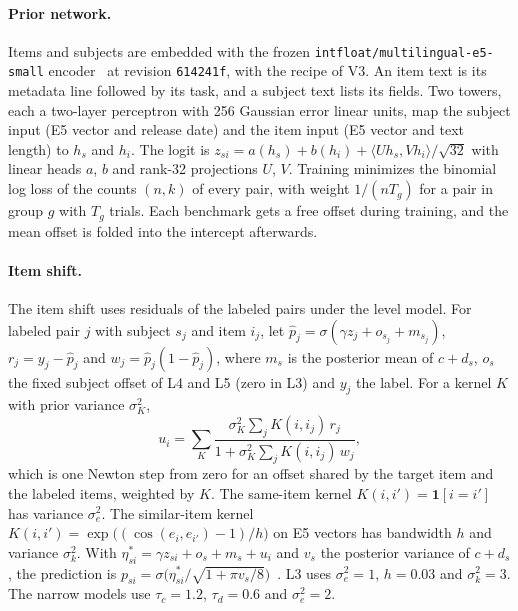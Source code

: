 \documentclass{article}
\begin{document}
\paragraph{Prior network.} Items and subjects are embedded with the frozen \texttt{intfloat/multilingual-e5-small} encoder~\citep{e5} at revision \texttt{614241f}, with the recipe of V3. An item text is its metadata line followed by its task, and a subject text lists its fields. Two towers, each a two-layer perceptron with 256 Gaussian error linear units, map the subject input (E5 vector and release date) and the item input (E5 vector and text length) to $h_s$ and $h_i$. The logit is $z_{si} = a(h_s) + b(h_i) + \langle U h_s, V h_i\rangle/\sqrt{32}$ with linear heads $a$, $b$ and rank-32 projections $U$, $V$. Training minimizes the binomial log loss of the counts $(n,k)$ of every pair, with weight $1/(nT_g)$ for a pair in group $g$ with $T_g$ trials. Each benchmark gets a free offset during training, and the mean offset is folded into the intercept afterwards.

\paragraph{Item shift.} The item shift uses residuals of the labeled pairs under the level model. For labeled pair $j$ with subject $s_j$ and item $i_j$, let $\hat p_j=\sigma(\gamma z_j + o_{s_j} + m_{s_j})$, $r_j = y_j-\hat p_j$ and $w_j=\hat p_j(1-\hat p_j)$, where $m_s$ is the posterior mean of $c+d_s$, $o_s$ the fixed subject offset of L4 and L5 (zero in L3) and $y_j$ the label. For a kernel $K$ with prior variance $\sigma_K^2$,
\begin{equation}
u_i = \sum_{K} \frac{\sigma_K^2 \sum_j K(i,i_j)\, r_j}{1+\sigma_K^2\sum_j K(i,i_j)\, w_j},
\label{eq:shift}
\end{equation}
which is one Newton step from zero for an offset shared by the target item and the labeled items, weighted by $K$.
The same-item kernel $K(i,i')=\mathbf 1[i=i']$ has variance $\sigma_e^2$. The similar-item kernel $K(i,i')=\exp\bigl((\cos(e_i,e_{i'})-1)/h\bigr)$ on E5 vectors has bandwidth $h$ and variance $\sigma_k^2$.
With $\eta^*_{si}=\gamma z_{si}+o_s+m_s+u_i$ and $v_s$ the posterior variance of $c+d_s$, the prediction is $p_{si}=\sigma\bigl(\eta^*_{si}/\sqrt{1+\pi v_s/8}\bigr)$~\citep{mackay}.
L3 uses $\sigma_e^2=1$, $h=0.03$ and $\sigma_k^2=3$. The narrow models use $\tau_c=1.2$, $\tau_d=0.6$ and $\sigma_e^2=2$.
\end{document}
